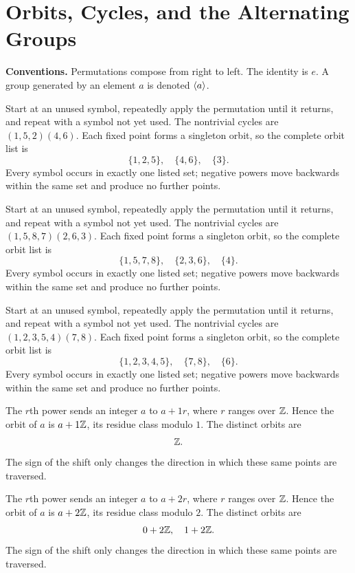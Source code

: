 \section{Orbits, Cycles, and the Alternating Groups}
\textbf{Conventions.} Permutations compose from right to left. The identity is $e$. A group generated by an element $a$ is denoted $\langle a\rangle$.

\idea Start at an unused symbol, repeatedly apply the permutation until it returns, and repeat with a symbol not yet used.
The nontrivial cycles are $(1,5,2)(4,6)$. Each fixed point forms a singleton orbit, so the complete orbit list is\[\{1,2,5\},\quad \{4,6\},\quad \{3\}.\]Every symbol occurs in exactly one listed set; negative powers move backwards within the same set and produce no further points.

\idea Start at an unused symbol, repeatedly apply the permutation until it returns, and repeat with a symbol not yet used.
The nontrivial cycles are $(1,5,8,7)(2,6,3)$. Each fixed point forms a singleton orbit, so the complete orbit list is\[\{1,5,7,8\},\quad \{2,3,6\},\quad \{4\}.\]Every symbol occurs in exactly one listed set; negative powers move backwards within the same set and produce no further points.

\idea Start at an unused symbol, repeatedly apply the permutation until it returns, and repeat with a symbol not yet used.
The nontrivial cycles are $(1,2,3,5,4)(7,8)$. Each fixed point forms a singleton orbit, so the complete orbit list is\[\{1,2,3,4,5\},\quad \{7,8\},\quad \{6\}.\]Every symbol occurs in exactly one listed set; negative powers move backwards within the same set and produce no further points.

The $r$th power sends an integer $a$ to $a+1r$, where $r$ ranges over $\mathbb{Z}$. Hence the orbit of $a$ is $a+1\mathbb{Z}$, its residue class modulo $1$. The distinct orbits are\[\mathbb{Z}.\]The sign of the shift only changes the direction in which these same points are traversed.

The $r$th power sends an integer $a$ to $a+2r$, where $r$ ranges over $\mathbb{Z}$. Hence the orbit of $a$ is $a+2\mathbb{Z}$, its residue class modulo $2$. The distinct orbits are\[0+2\mathbb{Z},\quad 1+2\mathbb{Z}.\]The sign of the shift only changes the direction in which these same points are traversed.

